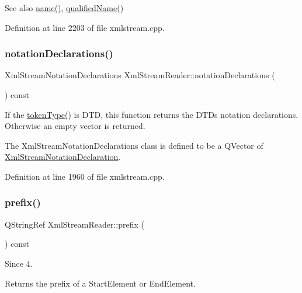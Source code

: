 \begin{DoxySeeAlso}{See also}
\hyperlink{class_xml_stream_reader_a09b44691e1e74daa6bdd4ed465d3c0a2}{name()}, \hyperlink{class_xml_stream_reader_a1afff37e8245261beb5c31db56912b8c}{qualified\+Name()} 
\end{DoxySeeAlso}


Definition at line 2203 of file xmlstream.\+cpp.

\mbox{\label{class_xml_stream_reader_af1980e6e4fa0ec4468bb384000bf33db}} 
\subsubsection{\texorpdfstring{notation\+Declarations()}{notationDeclarations()}}
{\footnotesize\ttfamily Xml\+Stream\+Notation\+Declarations Xml\+Stream\+Reader\+::notation\+Declarations (\begin{DoxyParamCaption}{ }\end{DoxyParamCaption}) const}

If the \hyperlink{class_xml_stream_reader_a2c26bfb63c27f2992e24f038d65c8c0a}{token\+Type()} is  D\+TD, this function returns the D\+TD\textquotesingle{}s notation declarations. Otherwise an empty vector is returned.

The Xml\+Stream\+Notation\+Declarations class is defined to be a Q\+Vector of \hyperlink{class_xml_stream_notation_declaration}{Xml\+Stream\+Notation\+Declaration}. 

Definition at line 1960 of file xmlstream.\+cpp.

\mbox{\label{class_xml_stream_reader_aed2c2d3189639c9f73dc50432c628204}} 
\subsubsection{\texorpdfstring{prefix()}{prefix()}}
{\footnotesize\ttfamily Q\+String\+Ref Xml\+Stream\+Reader\+::prefix (\begin{DoxyParamCaption}{ }\end{DoxyParamCaption}) const}

\begin{DoxySince}{Since}
4.
\end{DoxySince}
Returns the prefix of a Start\+Element or End\+Element.

